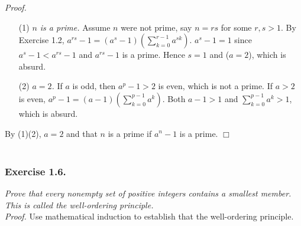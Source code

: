 \documentclass{article}
\begin{document}
\emph{Proof.}
\begin{enumerate}
\item[(1)]
\emph{$n$ is a prime.}
Assume $n$ were not prime, say $n = rs$ for some $r, s > 1$.
By Exercise 1.2,
$a^{rs} - 1 = (a^s - 1)(\sum_{k=0}^{r-1} a^{sk})$.
$a^s - 1 = 1$ since $a^s - 1 < a^{rs} - 1$ and $a^{rs} - 1$ is a prime.
Hence $s=1$ and ($a=2$), which is absurd.
\item[(2)]
\emph{$a = 2$.}
If $a$ is odd, then $a^p - 1 > 2$ is even, which is not a prime.
If $a > 2$ is even,
$a^p - 1 = (a - 1)(\sum_{k=0}^{p-1} a^k)$.
Both $a - 1 > 1$ and $\sum_{k=0}^{p-1} a^k > 1$, which is absurd.
\end{enumerate}
By (1)(2), $a = 2$ and that $n$ is a prime if $a^n - 1$ is a prime.
$\Box$ \\\\






\subsubsection*{Exercise 1.6.}
\emph{Prove that every nonempty set of positive integers contains a smallest member.
This is called the well-ordering principle.} \\

\emph{Proof.}
Use mathematical induction to establish
that the well-ordering principle.
\end{document}
